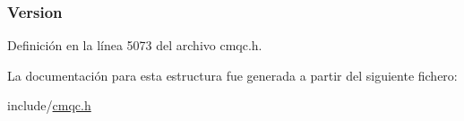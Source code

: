\subsubsection[{Version}]{ Version}\label{structtag_m_q_s_m_p_o_a0656ef8f766b3907d394d88a35d7b7e9}


Definición en la línea 5073 del archivo cmqc.\+h.



La documentación para esta estructura fue generada a partir del siguiente fichero\+:\begin{DoxyCompactItemize}
\item 
include/\hyperlink{cmqc_8h}{cmqc.\+h}\end{DoxyCompactItemize}
